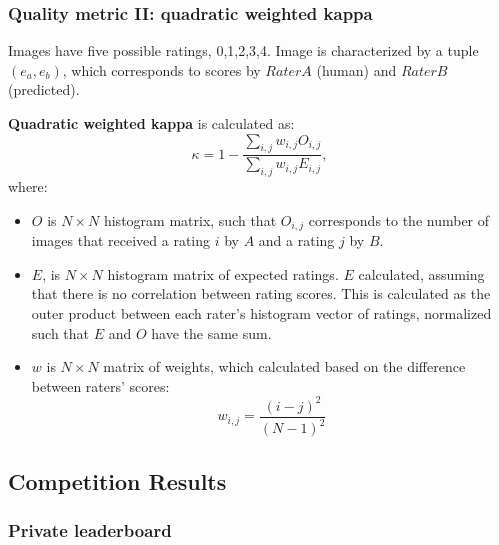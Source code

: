 \begin{frame}\frametitle{Quality metric II: quadratic weighted kappa} 
\small
\vspace{-15pt}

\footnotesize { %
Images have five possible ratings, 0,1,2,3,4.  Image is characterized by a tuple $(e_a,e_b)$, which corresponds to scores by $Rater A$ (human) and $Rater B$ (predicted). 

{\bf Quadratic weighted kappa} is calculated as: 
\vspace{-2pt}
\[ \kappa=1-\frac{\sum_{i,j}w_{i,j}O_{i,j}}{\sum_{i,j}w_{i,j}E_{i,j}}, \]
\vspace{-5pt}
where:
\vspace{1pt}
\begin{itemize}
\item $O$ is $N\times N$ histogram matrix, such that $O_{i,j}$ corresponds to the number of images that received a rating $i$ by $A$ and a rating $j$ by $B$. 

\item $E$, is $N\times N$ histogram matrix of expected ratings. $E$ calculated, assuming that there is no correlation between rating scores.  This is calculated as the outer product between each rater's histogram vector of ratings, normalized such that $E$ and $O$ have the same sum.

\item $w$ is $N\times N$ matrix of weights, which calculated based on the difference between raters' scores:
\vspace{-1pt}
\[ w_{i,j} = \frac{\left(i-j\right)^2}{\left(N-1\right)^2} \]

\end{itemize}

}

\end{frame}

\subsection{Competition Results}

\begin{frame}\frametitle{Private leaderboard} 
\vspace{-20pt}
\begin{center}
\begin{figure}
\end{figure}
\end{center}
\end{frame}


